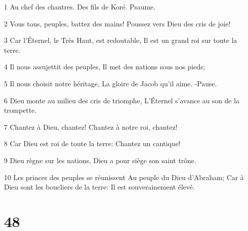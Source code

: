 \par 1 Au chef des chantres. Des fils de Koré. Psaume.
\par 2 Vous tous, peuples, battez des mains! Poussez vers Dieu des cris de joie!
\par 3 Car l'Éternel, le Très Haut, est redoutable, Il est un grand roi sur toute la terre.
\par 4 Il nous assujettit des peuples, Il met des nations sous nos pieds;
\par 5 Il nous choisit notre héritage, La gloire de Jacob qu'il aime. -Pause.
\par 6 Dieu monte au milieu des cris de triomphe, L'Éternel s'avance au son de la trompette.
\par 7 Chantez à Dieu, chantez! Chantez à notre roi, chantez!
\par 8 Car Dieu est roi de toute la terre: Chantez un cantique!
\par 9 Dieu règne sur les nations, Dieu a pour siège son saint trône.
\par 10 Les princes des peuples se réunissent Au peuple du Dieu d'Abraham; Car à Dieu sont les boucliers de la terre: Il est souverainement élevé.

\chapter{48}

